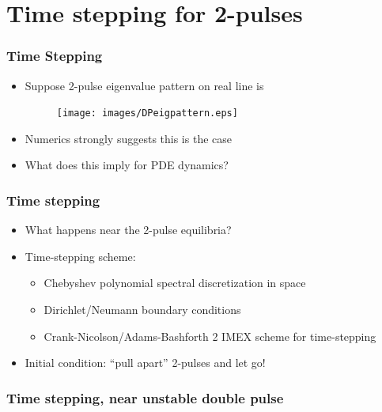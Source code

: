 \documentclass[16pt]{beamer}
\begin{document}
\section{Time stepping for 2-pulses}

\begin{frame}
	\frametitle{Time Stepping}
	\fontsize{16}{7.2}\selectfont
	\begin{itemize}
		\item Suppose 2-pulse eigenvalue pattern on real line is 
		\begin{figure}
		\begin{center}
		\texttt{[image: images/DPeigpattern.eps]}
		\end{center}
		\end{figure}
		\item Numerics strongly suggests this is the case
		\vspace{0.5cm}
		\item What does this imply for PDE dynamics?
	\end{itemize}
\end{frame}

\begin{frame}
	\frametitle{Time stepping}
	\fontsize{16}{7.2}\selectfont
	\begin{itemize}
		\item What happens near the 2-pulse equilibria?
		\vspace{0.5cm}
		\item Time-stepping scheme:
		\begin{itemize}
			\item Chebyshev polynomial spectral discretization in space
			\item Dirichlet/Neumann boundary conditions
			\item Crank-Nicolson/Adams-Bashforth 2 IMEX scheme for time-stepping
		\end{itemize}
		\vspace{0.5cm}
		\item Initial condition: ``pull apart'' 2-pulses and let go!
	\end{itemize}
\end{frame}

\begin{frame}
	\frametitle{Time stepping, near unstable double pulse}
	\fontsize{16}{7.2}\selectfont
	\begin{center}
	\end{center}
\end{frame}
\end{document}
